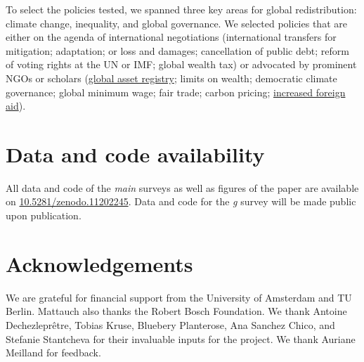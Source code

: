 \begin{bibunit}
\begin{small}
To select the policies tested, we spanned three key areas for global redistribution: climate change, inequality, and global governance. We selected policies that are either on the agenda of international negotiations (international transfers for mitigation; adaptation; or loss and damages; cancellation of public debt; reform of voting rights at the UN or IMF; global wealth tax) or advocated by prominent NGOs or scholars (\href{https://static1.squarespace.com/static/5a0c602bf43b5594845abb81/t/5c988368eef1a1538c2ae7eb/1553498989927/GAR.pdf}{global asset registry}; limits on wealth;\citep{robeyns_limitarianism_2024,piketty_brief_2022} democratic climate governance;\citep{dryzek_global_2011} global minimum wage;\citep{palley_financial_2013} fair trade;\citep{hickel_divide_2017} carbon pricing;\citep{cramton_global_2017} \href{https://concordeurope.org/wp-content/uploads/2019/11/CONCORD_AidWatch_Report_2019_web.pdf}{increased foreign aid}).



\section*{\normalsize Data and code availability}

All data and code of the \textit{main} surveys as well as figures of the paper are available on \href{https://zenodo.org/doi/10.5281/zenodo.11202245}{10.5281/zenodo.11202245}. %
Data and code for the \textit{g} survey will be made public upon publication. %

\section*{\normalsize Acknowledgements}

We are grateful for financial support from the University of Amsterdam and TU Berlin. Mattauch also thanks the Robert Bosch Foundation. %
We thank Antoine Dechezleprêtre, Tobias Kruse, Bluebery Planterose, Ana Sanchez Chico, and Stefanie Stantcheva for their invaluable inputs for the project. We thank Auriane Meilland for feedback. %


\end{small}
\end{bibunit}
